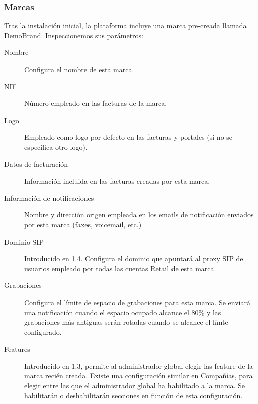 \documentclass[letterpaper,10pt,spanish]{sphinxmanual}
\begin{document}
\subsubsection{Marcas}
\label{internal_calls/god_portal:brands}
Tras la instalación inicial, la plataforma incluye una marca pre-creada llamada DemoBrand. Inspeccionemos sus parámetros:
\begin{description}
\item[{Nombre}] \leavevmode{}\label{internal_calls/god_portal:term-name}
Configura el nombre de esta marca.

\item[{NIF}] \leavevmode{}\label{internal_calls/god_portal:term-nif}
Número empleado en las facturas de la marca.

\item[{Logo}] \leavevmode{}\label{internal_calls/god_portal:term-logo}
Empleado como logo por defecto en las facturas y portales (si no se especifica otro logo).

\item[{Datos de facturación}] \leavevmode{}\label{internal_calls/god_portal:term-invoice-data}
Información incluida en las facturas creadas por esta marca.

\item[{Información de notificaciones}] \leavevmode{}\label{internal_calls/god_portal:term-mail-data}
Nombre y dirección origen empleada en los emails de notificación enviados por esta marca (faxes, voicemail, etc.)

\item[{Dominio SIP}] \leavevmode{}\label{internal_calls/god_portal:term-sip-domain}
Introducido en 1.4. Configura el dominio que apuntará al proxy SIP de usuarios empleado por todas las cuentas Retail de esta marca.

\item[{Grabaciones}] \leavevmode{}\label{internal_calls/god_portal:term-recordings}
Configura el límite de espacio de grabaciones para esta marca. Se enviará una notificación cuando el espacio ocupado alcance el 80\% y las grabaciones más antiguas serán rotadas cuando se alcance el límte configurado.

\item[{Features}] \leavevmode{}\label{internal_calls/god_portal:term-features}
Introducido en 1.3, permite al administrador global elegir las feature de la marca recién creada. Existe una configuración similar en Compañías, para elegir entre las que el administrador global ha habilitado a la marca. Se habilitarán o deshabilitarán secciones en función de esta configuración.

\end{description}
\end{document}
